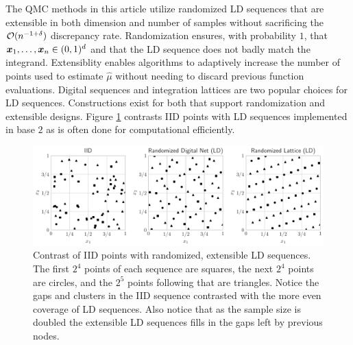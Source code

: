 \documentclass{article}[12pt]
\begin{document}
The QMC methods in this article utilize randomized LD sequences that are extensible in both dimension and number of samples without sacrificing the $\mathcal{O}(n^{-1+\delta})$ discrepancy rate. Randomization ensures, with probability $1$, that $\boldsymbol{x}_1,\dots,\boldsymbol{x}_n \in (0,1)^d$ and that the LD sequence does not badly match the integrand. Extensiblity enables algorithms to adaptively increase the number of points used to estimate $\hat{\mu}$ without needing to discard previous function evaluations. Digital sequences and integration lattices are two popular choices for LD sequences. Constructions exist for both that support randomization and extensible designs. Figure \ref{fig:ld_seqs} contrasts IID points with LD sequences implemented in base $2$ as is often done for computational efficiently.

\begin{figure}[H]
    \centering
    \includegraphics[width=\textwidth]{figs/ld_seqs.pdf}
    \caption{Contrast of IID points with randomized, extensible LD sequences. The first $2^4$ points of each sequence are squares, the next $2^4$ points are circles, and the $2^5$ points following that are triangles. Notice the gaps and clusters in the IID sequence contrasted with the more even coverage of LD sequences. Also notice that as the sample size is doubled the extensible LD sequences fills in the gaps left by previous nodes.}
    \label{fig:ld_seqs}
\end{figure}

\end{document}
